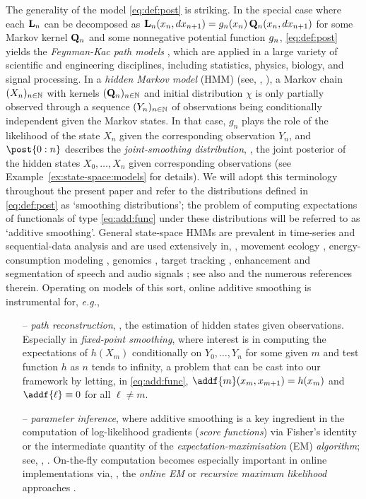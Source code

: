 The generality of the model \eqref{eq:def:post} is striking. In the special case where each $\mathbf{L}_{n}$ can be decomposed as $\mathbf{L}_{n}(x_n, d x_{n + 1}) = g_{n}(x_n) \, \mathbf{Q}_n(x_n, d x_{n + 1})$ for some Markov kernel $\mathbf{Q}_n$ and some nonnegative potential function $g_{n}$, \eqref{eq:def:post} yields the \emph{Feynman-Kac path models} \cite{delmoral:2004}, which are applied in a large variety of scientific and engineering disciplines, including statistics, physics, biology, and signal processing. In a \emph{hidden Markov model} (HMM) (see, \eg,  \cite{Cappe:2005:IHM:1088883}), a Markov chain $(X_n)_{n \in \mathbb{N}}$ with kernels $(\mathbf{Q}_n)_{n \in \mathbb{N}}$ and initial distribution $\chi$ is only partially observed through a sequence $(Y_n)_{n \in \mathbb{N}}$ of observations being conditionally independent given the Markov states. In that case, $g_n$ plays the role of the likelihood of the state $X_n$ given the corresponding observation $Y_n$, and $\post{0:n}$ describes the \emph{joint-smoothing distribution}, \ie, the joint posterior of the hidden states $X_0, \ldots, X_n$ given corresponding observations (see Example~\ref{ex:state-space:models} for details). We will adopt this terminology throughout the present paper and refer to the distributions defined in \eqref{eq:def:post} as `smoothing distributions'; the problem of computing expectations of functionals of type \eqref{eq:add:func} under these distributions will be referred to as `additive smoothing'. General state-space HMMs are prevalent in time-series and sequential-data analysis and are used extensively in, \eg, movement ecology \cite{michelot2016movehmm}, energy-consumption modeling \cite{candanedo2017methodology}, genomics \cite{yau2011bayesian}, target tracking \cite{sarkka2007rao}, enhancement and segmentation of speech and audio signals \cite{rabiner1989tutorial}; see also \cite{sarkka2013bayesian, zucchini2017hidden} and the numerous references therein. Operating on models of this sort, online additive smoothing is instrumental for, \emph{e.g.},    
\begin{enumerate}
    \item[--] \emph{path reconstruction}, \ie, the estimation of hidden states given observations. Especially in \emph{fixed-point smoothing}, where interest is in computing the expectations of $h(X_m)$ conditionally on $Y_0, \ldots, Y_n$ for some given $m$ and test function $h$ as $n$ tends to infinity, a problem that can be cast into our framework by letting, in \eqref{eq:add:func}, $\addf{m}(x_m, x_{m + 1}) = h(x_m)$ and $\addf{\ell} \equiv 0$ for all $\ell \neq m$. 
    \item[--] \emph{parameter inference}, where additive smoothing is a key ingredient in the computation of log-likelihood gradients (\emph{score functions}) via Fisher's identity or the intermediate quantity of the \emph{expectation-maximisation} (EM) \emph{algorithm}; see, \eg, \cite[Chapter~10]{Cappe:2005:IHM:1088883}. On-the-fly computation becomes especially important in online implementations via, \eg, the \emph{online EM} or \emph{recursive maximum likelihood} approaches \cite{cappe:2009,legland:mevel:1997}.  
 \end{enumerate}

